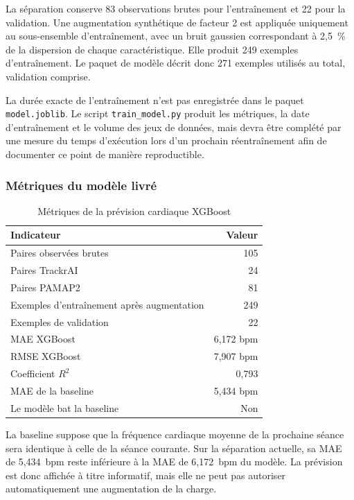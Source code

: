 \documentclass[11pt,a4paper]{article}
\newcommand{\code}[1]{\nolinkurl{#1}}
\begin{document}
La séparation conserve 83 observations brutes pour l'entraînement et 22 pour la validation. Une augmentation synthétique de facteur 2 est appliquée uniquement au sous-ensemble d'entraînement, avec un bruit gaussien correspondant à 2,5~\% de la dispersion de chaque caractéristique. Elle produit 249 exemples d'entraînement. Le paquet de modèle décrit donc 271 exemples utilisés au total, validation comprise.

La durée exacte de l'entraînement n'est pas enregistrée dans le paquet \code{model.joblib}. Le script \code{train_model.py} produit les métriques, la date d'entraînement et le volume des jeux de données, mais devra être complété par une mesure du temps d'exécution lors d'un prochain réentraînement afin de documenter ce point de manière reproductible.

\subsubsection{Métriques du modèle livré}

\begin{table}[H]
\centering
\caption{Métriques de la prévision cardiaque XGBoost}
\label{tab:ia-metrics}
\begin{tabular}{lr}
\toprule
\textbf{Indicateur} & \textbf{Valeur} \\
\midrule
Paires observées brutes & 105 \\
Paires TrackrAI & 24 \\
Paires PAMAP2 & 81 \\
Exemples d'entraînement après augmentation & 249 \\
Exemples de validation & 22 \\
MAE XGBoost & 6,172 bpm \\
RMSE XGBoost & 7,907 bpm \\
Coefficient $R^2$ & 0,793 \\
MAE de la baseline & 5,434 bpm \\
Le modèle bat la baseline & Non \\
\bottomrule
\end{tabular}
\end{table}

La baseline suppose que la fréquence cardiaque moyenne de la prochaine séance sera identique à celle de la séance courante. Sur la séparation actuelle, sa MAE de 5,434~bpm reste inférieure à la MAE de 6,172~bpm du modèle. La prévision est donc affichée à titre informatif, mais elle ne peut pas autoriser automatiquement une augmentation de la charge.
\end{document}
